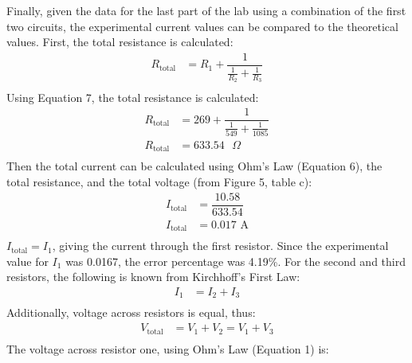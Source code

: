 \documentclass [12pt, letterpaper, twoside] {article}
\begin{document}
Finally, given the data for the last part of the lab using a combination of the first two circuits, the experimental current values can be compared to the theoretical values. First, the total resistance is calculated:
\begin{equation}
  \begin{split}
    R_{\text{total}} &= R_{1} + \dfrac{1}{\tfrac{1}{R_{2}} + \tfrac{1}{R_{3}}} \\
  \end{split}
\end{equation}
Using Equation 7, the total resistance is calculated:
\begin{equation*}
  \begin{split}
    R_{\text{total}} &= 269 + \dfrac{1}{\tfrac{1}{549} + \tfrac{1}{1085}} \\
    R_{\text{total}} &= 633.54\text{ }\Omega \\ %
  \end{split}
\end{equation*}
Then the total current can be calculated using Ohm's Law (Equation 6), the total resistance, and the total voltage (from Figure 5, table c):
\begin{equation*}
  \begin{split}
    I_{\text{total}} &= \dfrac{10.58}{633.54} \\
    I_{\text{total}} &= 0.017\text{ A} \\ %
  \end{split}
\end{equation*}
\(I_{\text{total}} = I_{1}\), giving the current through the first resistor. Since the experimental value for \(I_{1}\) was 0.0167, the error percentage was 4.19\%. For the second and third resistors, the following is known from Kirchhoff's First Law: %
\begin{equation}
  \begin{split}
    I_{1} &= I_{2} + I_{3} \\
  \end{split}
\end{equation}
Additionally, voltage across resistors is equal, thus:
\begin{equation}
  \begin{split}
    V_{\text{total}} &= V_{1} + V_{2} = V_{1} + V_{3} \\
  \end{split}
\end{equation}
The voltage across resistor one, using Ohm's Law (Equation 1) is:
\end{document}

